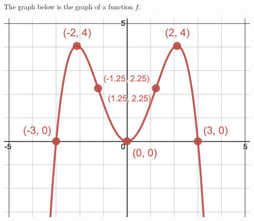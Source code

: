 \documentclass{siproblemset}
\begin{document}
    \begin{multipartquestion}{The graph below is the graph of a function $f$.}
        \begin{multicols}{2}
            \begin{center}
                \includegraphics[width=\linewidth]{img/pt3-graph1}
            \end{center}
            \vfill\null
            \columnbreak
            \ \newline
            \ \newline
            \ \newline
        \end{multicols}
    \end{multipartquestion}
\end{document}
